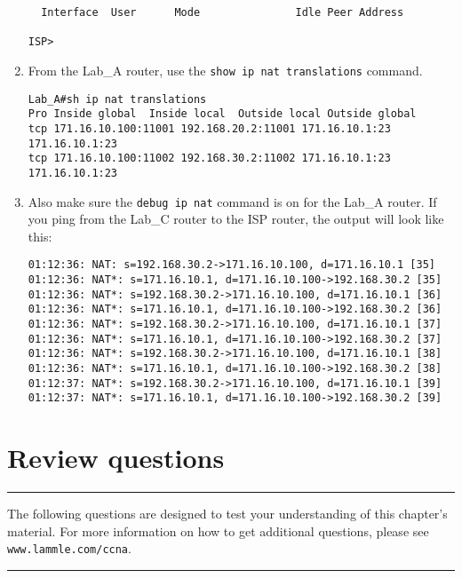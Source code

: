 \begin{enumerate}
\begin{verbatim}
  Interface  User      Mode               Idle Peer Address
 
ISP>
\end{verbatim}
\item
  From the Lab\_A router, use the \texttt{show\ ip\ nat\ translations}
  command.

\begin{verbatim}
Lab_A#sh ip nat translations
Pro Inside global  Inside local  Outside local Outside global
tcp 171.16.10.100:11001 192.168.20.2:11001 171.16.10.1:23    
171.16.10.1:23
tcp 171.16.10.100:11002 192.168.30.2:11002 171.16.10.1:23    
171.16.10.1:23
\end{verbatim}
\item
  Also make sure the \texttt{debug\ ip\ nat} command is on for the
  Lab\_A router. If you ping from the Lab\_C router to the ISP router,
  the output will look like this:

\begin{verbatim}
01:12:36: NAT: s=192.168.30.2->171.16.10.100, d=171.16.10.1 [35]
01:12:36: NAT*: s=171.16.10.1, d=171.16.10.100->192.168.30.2 [35]
01:12:36: NAT*: s=192.168.30.2->171.16.10.100, d=171.16.10.1 [36]
01:12:36: NAT*: s=171.16.10.1, d=171.16.10.100->192.168.30.2 [36]
01:12:36: NAT*: s=192.168.30.2->171.16.10.100, d=171.16.10.1 [37]
01:12:36: NAT*: s=171.16.10.1, d=171.16.10.100->192.168.30.2 [37]
01:12:36: NAT*: s=192.168.30.2->171.16.10.100, d=171.16.10.1 [38]
01:12:36: NAT*: s=171.16.10.1, d=171.16.10.100->192.168.30.2 [38]
01:12:37: NAT*: s=192.168.30.2->171.16.10.100, d=171.16.10.1 [39]
01:12:37: NAT*: s=171.16.10.1, d=171.16.10.100->192.168.30.2 [39]
\end{verbatim}
\end{enumerate}



\section{Review questions}

\begin{center}\rule{0.5\linewidth}{0.5pt}\end{center}


The
following questions are designed to test your understanding of this
chapter's material. For more information on how to get additional
questions, please see \texttt{www.lammle.com/ccna}.

\begin{center}\rule{0.5\linewidth}{0.5pt}\end{center}


